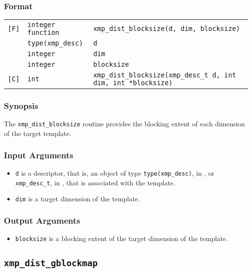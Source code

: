 \subsubsection*{Format}

\begin{tabular}{lll}

\verb![F]!& {\tt integer function}& {\tt xmp\_dist\_blocksize(d, dim, blocksize)}\\
          & {\tt type(xmp\_desc)} & {\tt d}\\
          & {\tt integer} & {\tt dim}\\
          & {\tt integer} & {\tt blocksize}\\

\verb![C]!&  {\tt int}& {\tt xmp\_dist\_blocksize(xmp\_desc\_t d, int dim, int *blocksize)}\\

\end{tabular}

\subsubsection*{Synopsis}

The {\tt xmp\_dist\_blocksize} routine provides the blocking extent of each dimension of the target template.


\subsubsection*{Input Arguments}
\begin{itemize}
 \item {\tt d} is a descriptor, that is, an object of type 
       {\tt type(xmp\_desc)}, in {\XMPF}, or {\tt xmp\_desc\_t},
       in {\XMPC}, that is associated with the template.
        \item {\tt dim} is a target dimension of the template.
\end{itemize}

\subsubsection*{Output Arguments}
\begin{itemize}
 \item {\tt blocksize} is a blocking extent of the target dimension of the template.
\end{itemize}


\subsection{\tt xmp\_dist\_gblockmap}

